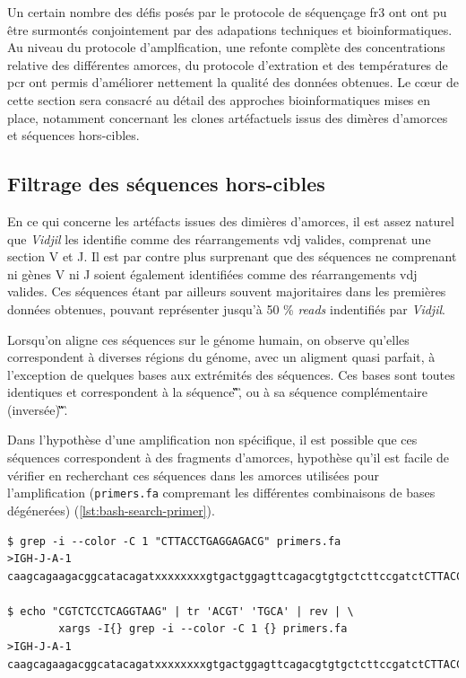 Un certain nombre des défis posés par le protocole de séquençage \gls{fr}3 ont ont pu être surmontés conjointement par 
des adapations techniques et bioinformatiques. Au niveau du protocole d'amplfication, une refonte complète des concentrations 
relative des différentes amorces, du protocole d'extration et des températures de \gls{pcr} ont permis d'améliorer nettement 
la qualité des données obtenues. Le cœur de cette section sera consacré au détail des approches bioinformatiques mises en place, 
notamment concernant les clones artéfactuels issus des dimères d'amorces et séquences hors-cibles.

\subsection{Filtrage des séquences hors-cibles}

En ce qui concerne les artéfacts issues des dimières d'amorces, il est assez naturel que \textit{Vidjil} les identifie comme 
des réarrangements \gls{vdj} valides, comprenat une section V et J. Il est par contre plus surprenant que des séquences ne comprenant 
ni gènes V ni J soient également identifiées comme des réarrangements \gls{vdj} valides. Ces séquences étant par ailleurs souvent majoritaires 
dans les premières données obtenues, pouvant représenter jusqu'à 50 \% \textit{reads} indentifiés par \textit{Vidjil}.

\vspace{1em}

Lorsqu'on aligne ces séquences sur le génome humain, on observe qu'elles correspondent à diverses régions du génome, avec un aligment quasi 
parfait, à l'exception de quelques bases aux extrémités des séquences. Ces bases sont toutes identiques et correspondent à la séquence 
\C\G\T\C\T\C\C\T\C\A\G\G\T\A\A\G, ou à sa séquence complémentaire (inversée) \C\T\T\A\C\C\T\G\A\G\G\A\G\A\C\G.

Dans l'hypothèse d'une amplification non spécifique, il est possible que ces séquences correspondent à des fragments d'amorces,
hypothèse qu'il est facile de vérifier en recherchant ces séquences dans les amorces utilisées pour l'amplification (\texttt{primers.fa} 
compremant les différentes combinaisons de bases dégénerées)
(\autoref{lst:bash-search-primer}).

\begin{lstlisting}[language=custombash, 
caption={Commande Bash et résultat de la recherche des séquences dans les amorces dégénérées.},
label={lst:bash-search-primer},
basicstyle=\ttfamily\scriptsize]
$ grep -i --color -C 1 "CTTACCTGAGGAGACG" primers.fa
>IGH-J-A-1
caagcagaagacggcatacagatxxxxxxxxgtgactggagttcagacgtgtgctcttccgatctCTTACCTGAGGAGACGgtgacc

$ echo "CGTCTCCTCAGGTAAG" | tr 'ACGT' 'TGCA' | rev | \
        xargs -I{} grep -i --color -C 1 {} primers.fa
>IGH-J-A-1
caagcagaagacggcatacagatxxxxxxxxgtgactggagttcagacgtgtgctcttccgatctCTTACCTGAGGAGACGgtgacc
\end{lstlisting}

